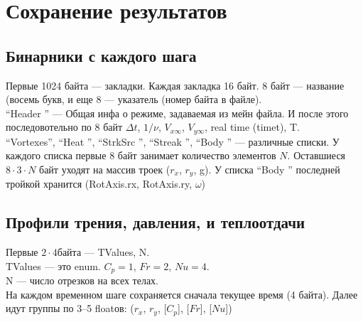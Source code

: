 \documentclass[11pt]{article}
\begin{document}
\newpage
\section{Сохранение результатов}

\subsection{Бинарники с каждого шага}
Первые 1024 байта --- закладки. Каждая закладка 16 байт. 8 байт --- название (восемь букв, и еще 8 --- указатель (номер байта в файле).\\
``Header  '' --- Общая инфа о режиме, задаваемая из мейн файла. И после этого последовотельно по 8 байт $\Delta t$, $1/\nu$, $V_{x\infty}$, $V_{y\infty}$, real time (timet), T.\\
``Vortexes'', ``Heat    '', ``StrkSrc '', ``Streak  '', ``Body    '' --- различные списки. У каждого списка первые 8 байт занимает количество элементов $N$. Оставшиеся $8\cdot 3 \cdot N$ байт уходят на массив троек ($r_x$, $r_y$, g). У списка ``Body    '' последней тройкой хранится (RotAxis.rx, RotAxis.ry, $\omega$)


\subsection{Профили трения, давления, и теплоотдачи}
Первые $2 \cdot 4$байта --- TValues, N.\\
TValues --- это enum. $C_p=1$, $Fr=2$, $Nu=4$.\\
N --- число отрезков на всех телах.\\
На каждом временном шаге сохраняется сначала текущее время (4 байта). Далее идут группы по 3--5 floatов: ($r_x$, $r_y$, [$C_p$], [$Fr$], [$Nu$])
\end{document}
